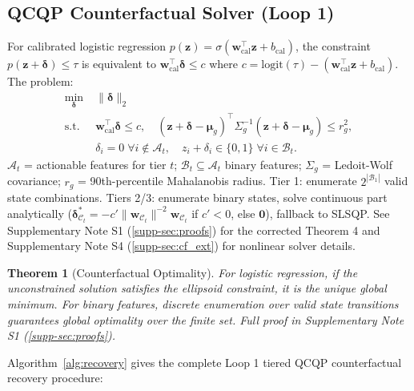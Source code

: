 \documentclass[11pt,a4paper]{article}
\theoremstyle{plain}
\newtheorem{theorem}{Theorem}
\begin{document}
\subsection{QCQP Counterfactual Solver (Loop 1)}
\label{sec:counterfactual}

For calibrated logistic regression $p(\mathbf z)=\sigma(\mathbf w_{\text{cal}}^\top\mathbf z+b_{\text{cal}})$, the constraint $p(\mathbf z+\boldsymbol\delta)\le\tau$ is equivalent to $\mathbf w_{\text{cal}}^\top\boldsymbol\delta \le c$ where $c = \text{logit}(\tau)-(\mathbf w_{\text{cal}}^\top\mathbf z+b_{\text{cal}})$. The problem:
\begin{equation}
\begin{aligned}
\min_{\boldsymbol\delta}\;&\|\boldsymbol\delta\|_2 \\
\text{s.t.}\;&\mathbf w_{\text{cal}}^\top\boldsymbol\delta\le c,\quad
(\mathbf z+\boldsymbol\delta-\boldsymbol\mu_g)^\top\Sigma_g^{-1}(\mathbf z+\boldsymbol\delta-\boldsymbol\mu_g)\le r_g^2,\\
&\delta_i=0\;\forall i\notin\mathcal A_t,\quad z_i+\delta_i\in\{0,1\}\;\forall i\in\mathcal B_t.
\end{aligned}
\end{equation}
$\mathcal A_t$ = actionable features for tier $t$; $\mathcal B_t\subseteq\mathcal A_t$ binary features; $\Sigma_g$ = Ledoit-Wolf covariance; $r_g$ = 90th-percentile Mahalanobis radius. Tier 1: enumerate $2^{|\mathcal B_1|}$ valid state combinations. Tiers 2/3: enumerate binary states, solve continuous part analytically ($\boldsymbol\delta_{\mathcal C_t}^* = -c'\|\mathbf w_{\mathcal C_t}\|^{-2}\mathbf w_{\mathcal C_t}$ if $c'<0$, else $\mathbf 0$), fallback to SLSQP. See Supplementary Note S1 (\ref{supp-sec:proofs}) for the corrected Theorem 4 and Supplementary Note S4 (\ref{supp-sec:cf_ext}) for nonlinear solver details.

\begin{theorem}[Counterfactual Optimality]
For logistic regression, if the unconstrained solution satisfies the ellipsoid constraint, it is the unique global minimum. For binary features, discrete enumeration over valid state transitions guarantees global optimality over the finite set. Full proof in Supplementary Note S1 (\ref{supp-sec:proofs}).
\end{theorem}

Algorithm~\ref{alg:recovery} gives the complete Loop 1 tiered QCQP counterfactual recovery procedure:
\end{document}
